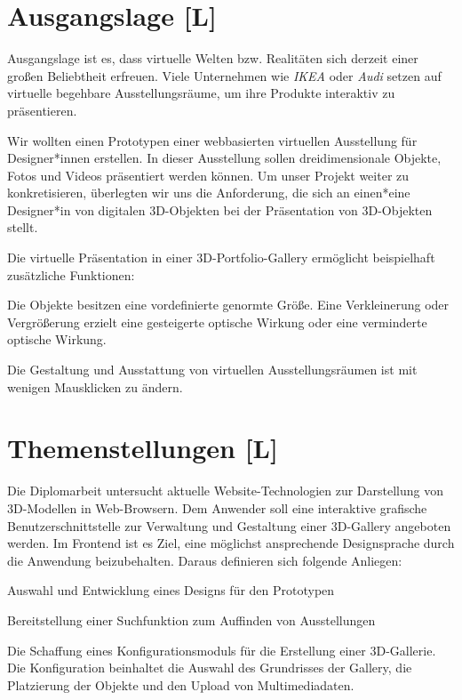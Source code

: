 \section{Ausgangslage [L]}
Ausgangslage ist es, dass virtuelle Welten bzw. Realitäten sich derzeit einer großen Beliebtheit erfreuen. Viele Unternehmen wie \emph{IKEA} oder \emph{Audi} setzen auf virtuelle begehbare Ausstellungsräume, um ihre Produkte interaktiv zu präsentieren. \cite{VrVW}

Wir wollten einen Prototypen einer webbasierten virtuellen Ausstellung für Designer*innen erstellen. In dieser Ausstellung sollen dreidimensionale Objekte, Fotos und Videos präsentiert werden können. Um unser Projekt weiter zu konkretisieren, überlegten wir uns die Anforderung, die sich an einen*eine Designer*in von digitalen 3D-Objekten bei der Präsentation von 3D-Objekten stellt.

Die virtuelle Präsentation in einer 3D-Portfolio-Gallery ermöglicht beispielhaft zusätzliche Funktionen:
\begin{compactitem}
    \item Die Objekte besitzen eine vordefinierte genormte Größe. Eine Verkleinerung oder Vergrößerung erzielt eine gesteigerte optische Wirkung oder eine verminderte optische Wirkung.
    \item Die Gestaltung und Ausstattung von virtuellen Ausstellungsräumen ist mit wenigen Mausklicken zu ändern.
\end{compactitem}


\section{Themenstellungen [L]}
Die Diplomarbeit untersucht aktuelle Website-Technologien zur Darstellung von 3D-Modellen in Web-Browsern.
Dem Anwender soll eine interaktive grafische Benutzerschnittstelle zur Verwaltung und Gestaltung einer 3D-Gallery angeboten werden.
Im Frontend ist es Ziel, eine möglichst ansprechende Designsprache durch die Anwendung beizubehalten.
Daraus definieren sich folgende Anliegen:
\begin{compactitem}
    \item Auswahl und Entwicklung eines Designs für den Prototypen
    \item Bereitstellung einer Suchfunktion zum Auffinden von Ausstellungen
    \item Die Schaffung eines Konfigurationsmoduls für die Erstellung einer 3D-Gallerie. Die Konfiguration beinhaltet die Auswahl des Grundrisses der Gallery, die Platzierung der Objekte und den Upload von Multimediadaten.
\end{compactitem}


